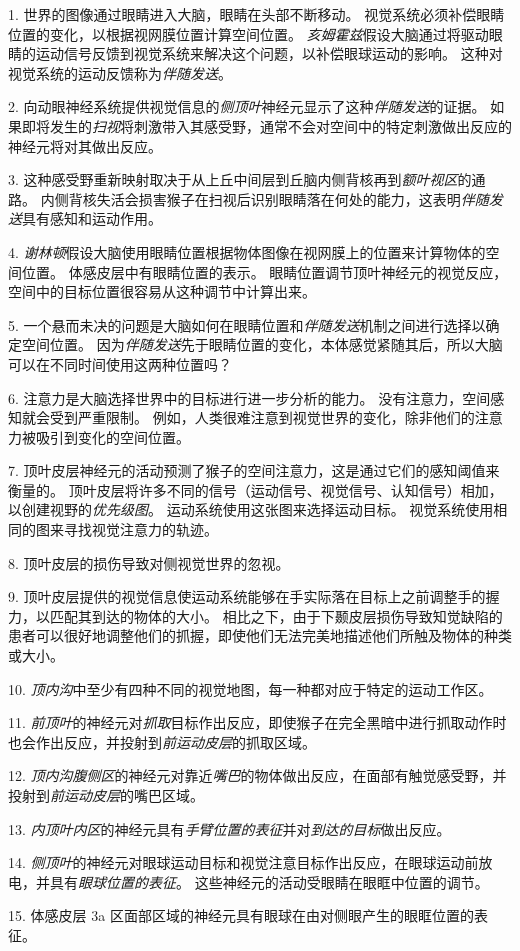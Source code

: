 1. 世界的图像通过眼睛进入大脑，眼睛在头部不断移动。
视觉系统必须补偿眼睛位置的变化，以根据视网膜位置计算空间位置。
\textit{亥姆霍兹}假设大脑通过将驱动眼睛的运动信号反馈到视觉系统来解决这个问题，以补偿眼球运动的影响。
这种对视觉系统的运动反馈称为\textit{伴随发送}。


2. 向动眼神经系统提供视觉信息的\textit{侧顶叶}神经元显示了这种\textit{伴随发送}的证据。
如果即将发生的\textit{扫视}将刺激带入其感受野，通常不会对空间中的特定刺激做出反应的神经元将对其做出反应。


3. 这种感受野重新映射取决于从上丘中间层到丘脑内侧背核再到\textit{额叶视区}的通路。
内侧背核失活会损害猴子在扫视后识别眼睛落在何处的能力，这表明\textit{伴随发送}具有感知和运动作用。


4. \textit{谢林顿}假设大脑使用眼睛位置根据物体图像在视网膜上的位置来计算物体的空间位置。
体感皮层中有眼睛位置的表示。
眼睛位置调节顶叶神经元的视觉反应，空间中的目标位置很容易从这种调节中计算出来。


5. 一个悬而未决的问题是大脑如何在眼睛位置和\textit{伴随发送}机制之间进行选择以确定空间位置。
因为\textit{伴随发送}先于眼睛位置的变化，本体感觉紧随其后，所以大脑可以在不同时间使用这两种位置吗？


6. 注意力是大脑选择世界中的目标进行进一步分析的能力。
没有注意力，空间感知就会受到严重限制。
例如，人类很难注意到视觉世界的变化，除非他们的注意力被吸引到变化的空间位置。


7. 顶叶皮层神经元的活动预测了猴子的空间注意力，这是通过它们的感知阈值来衡量的。
顶叶皮层将许多不同的信号（运动信号、视觉信号、认知信号）相加，以创建视野的\textit{优先级图}。
运动系统使用这张图来选择运动目标。
视觉系统使用相同的图来寻找视觉注意力的轨迹。


8. 顶叶皮层的损伤导致对侧视觉世界的忽视。


9. 顶叶皮层提供的视觉信息使运动系统能够在手实际落在目标上之前调整手的握力，以匹配其到达的物体的大小。
相比之下，由于下颞皮层损伤导致知觉缺陷的患者可以很好地调整他们的抓握，即使他们无法完美地描述他们所触及物体的种类或大小。


10. \textit{顶内沟}中至少有四种不同的视觉地图，每一种都对应于特定的运动工作区。


11. \textit{前顶叶}的神经元对\textit{抓取}目标作出反应，即使猴子在完全黑暗中进行抓取动作时也会作出反应，并投射到\textit{前运动皮层}的抓取区域。


12. \textit{顶内沟腹侧区}的神经元对靠近\textit{嘴巴}的物体做出反应，在面部有触觉感受野，并投射到\textit{前运动皮层}的嘴巴区域。 


13. \textit{内顶叶内区}的神经元具有\textit{手臂位置的表征}并对\textit{到达的目标}做出反应。


14. \textit{侧顶叶}的神经元对眼球运动目标和视觉注意目标作出反应，在眼球运动前放电，并具有\textit{眼球位置的表征}。
这些神经元的活动受眼睛在眼眶中位置的调节。


15. 体感皮层 3a 区面部区域的神经元具有眼球在由对侧眼产生的眼眶位置的表征。

